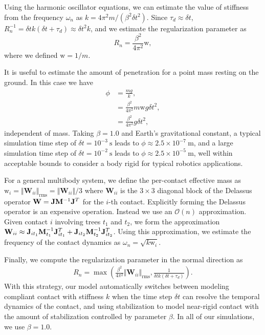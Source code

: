 Using the harmonic oscillator equations, we can estimate the value of stiffness
from the frequency $\omega_n$ as $k=4\pi^2 m/(\beta^2 \delta t^2)$. Since
$\tau_d\approx\delta t$, $R_n^{-1} = \delta t k(\delta t+\tau_d) \approx \delta
t^2k$, and we estimate the regularization parameter as
\begin{equation*}
	R_n = \frac{\beta^2}{4\pi^2}\text{w},
\end{equation*}
where we defined $\text{w}=1/m$.

It is useful to estimate the amount of penetration for a point mass resting on
the ground. In this case we have
\begin{align*}
	\phi &= \frac{mg}{k}, \\
	&= \frac{\beta^2}{4\pi^2}m\text{w}g\delta t^2,\\
	&= \frac{\beta^2}{4\pi^2}g\delta t^2,
\end{align*}
independent of mass. Taking $\beta=1.0$ and Earth's gravitational constant, a
typical simulation time step of $\delta t=10^{-3}~\text{s}$ leads to
$\phi\approx 2.5\times 10^{-7}~\text{m}$, and a large simulation time step of
$\delta t=10^{-2}~\text{s}$ leads to $\phi\approx 2.5\times 10^{-5}~\text{m}$,
well within acceptable bounds to consider a body rigid for typical robotics
applications.

For a general multibody system, we define the per-contact effective mass as
$\text{w}_i=\Vert\mathbf{W}_{ii}\Vert_\text{rms}=\Vert\mathbf{W}_{ii}\Vert/3$
where $\mathbf{W}_{ii}$ is the $3\times 3$ diagonal block of the Delassus
operator $\mathbf{W}={\mathbf{J}}{\mathbf{M}}^{-1}{\mathbf{J}}^T$ for the $i$-th contact.
Explicitly forming the Delassus operator is an expensive operation. Instead we
use an $\mathcal{O}(n)$ approximation. Given contact $i$ involving trees $t_1$
and $t_2$, we form the approximation $\mathbf{W}_{ii}\approx{\mathbf{J}}_{i
t_1}{\mathbf{M}}_{t_1}^{-1}{\mathbf{J}}_{i t_1}^T+{\mathbf{J}}_{i t_2}{\mathbf{M}}_{t_2}^{-1}{\mathbf{J}}_{i
t_2}^T$. Using this approximation, we estimate the frequency of the contact
dynamics as $\omega_n=\sqrt{k\text{w}_i}$.

Finally, we compute the regularization parameter in the normal direction as
\begin{eqnarray}
    R_n = \max\left(\frac{\beta^2}{4\pi^2}\Vert\mathbf{W}_{ii}\Vert_\text{rms},
    \frac{1}{\delta t k(\delta t+\tau_d)}\right)
    \label{eq:normal_regularization}.
\end{eqnarray}
With this strategy, our model automatically switches between modeling compliant
contact with stiffness $k$ when the time step $\delta t$ can resolve the
temporal dynamics of the contact, and using stabilization to model near-rigid
contact with the amount of stabilization controlled by parameter $\beta$. In all
of our simulations, we use $\beta=1.0$.

